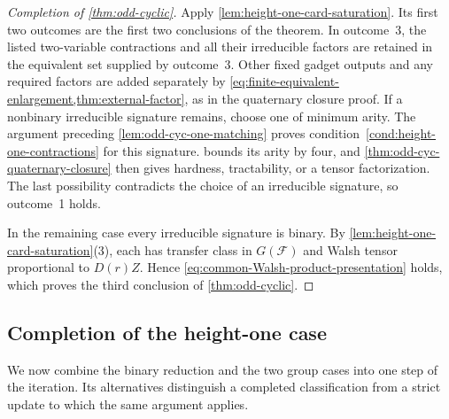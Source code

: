 \documentclass[11pt,letterpaper,onecolumn]{article}
\theoremstyle{plain}
\theoremstyle{definition}
\theoremstyle{remark}
\newcommand{\cF}{\mathcal F}
\begin{document}
	\begin{proof}[Completion of \cref{thm:odd-cyclic}]
		Apply \cref{lem:height-one-card-saturation}.  Its first two outcomes are the
		first two conclusions of the theorem.  In outcome~3, the listed two-variable
		contractions and all their irreducible factors are retained
		in the equivalent set supplied by outcome~3.
		Other fixed gadget outputs and any required factors are added separately
		by \cref{eq:finite-equivalent-enlargement,thm:external-factor}, as in the
		quaternary closure proof.  If a nonbinary irreducible signature remains, choose one of minimum arity.  The argument preceding
		\cref{lem:odd-cyc-one-matching} proves
		condition~\ref{cond:height-one-contractions} for this signature.
		 bounds its arity by four, and
		\cref{thm:odd-cyc-quaternary-closure} then gives hardness, tractability, or
		a tensor factorization.  The last possibility contradicts the choice of an
		irreducible signature, so outcome~1 holds.
		
		In the remaining case every irreducible signature is binary.
		By \cref{lem:height-one-card-saturation}\textnormal{(3)}, each has transfer
		class in \(G(\cF)\) and Walsh tensor proportional to \(D(r)Z\).
		Hence \cref{eq:common-Walsh-product-presentation} holds,
		which proves the third conclusion of \cref{thm:odd-cyclic}.
	\end{proof}
	

\subsection{Completion of the height-one case}

	We now combine the binary reduction and the two group cases into one
	step of the iteration. Its alternatives distinguish a completed
	classification from a strict update to which the same argument applies.
\end{document}
